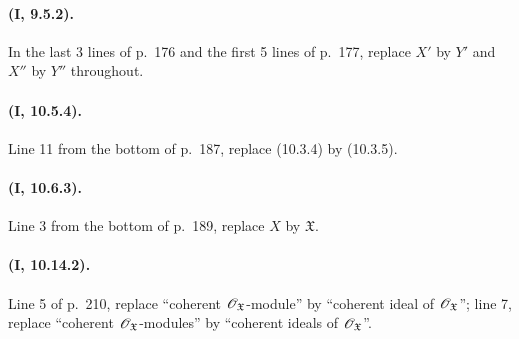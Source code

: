 \paragraph{(I, 9.5.2).}
In the last 3 lines of p.~176 and the first 5 lines of
p.~177, replace $X'$ by $Y'$ and $X''$ by $Y''$ throughout.

\paragraph{(I, 10.5.4).}
Line 11 from the bottom of p.~187, replace (10.3.4) by (10.3.5).

\paragraph{(I, 10.6.3).}
Line 3 from the bottom of p.~189, replace $X$ by $\mathfrak X$.

\paragraph{(I, 10.14.2).}
Line 5 of p.~210, replace ``coherent $\mathscr{O}_{\mathfrak X}$-module'' by
``coherent ideal of $\mathscr{O}_{\mathfrak X}$''; line 7, replace
``coherent $\mathscr{O}_{\mathfrak X}$-modules'' by ``coherent ideals of
$\mathscr{O}_{\mathfrak X}$''.
